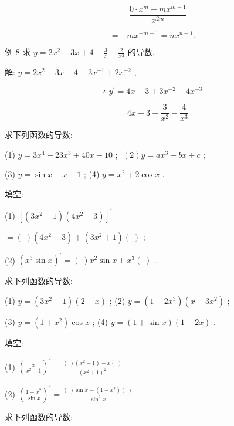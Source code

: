 \documentclass[lang=cn,newtx,10pt,scheme=chinese]{elegantbook}
\begin{document}
\[
= \frac{0 \cdot {x}^{m} - m{x}^{m - 1}}{{x}^{2m}}
\]

\[
= - m{x}^{-m - 1} = n{x}^{n - 1}.
\]

例 8 求 \(y = 2{x}^{2} - {3x} + 4 - \frac{3}{x} + \frac{2}{{x}^{2}}\) 的导数.

解: \(y = 2{x}^{2} - {3x} + 4 - 3{x}^{-1} + 2{x}^{-2}\) ,

\[
\therefore \;{y}^{\prime } = {4x} - 3 + 3{x}^{-2} - 4{x}^{-3}
\]

\[
= {4x} - 3 + \frac{3}{{x}^{2}} - \frac{4}{{x}^{3}}
\]

\begin{problemset}[练习]

\item 求下列函数的导数:

(1) \(y = 3{x}^{4} - {23}{x}^{3} + {40x} - {10}\) ; \(\;\left( 2\right) y = a{x}^{3} - {bx} + c\) ;

(3) \(y = \sin x - x + 1\) ; (4) \(y = {x}^{2} + 2\cos x\) .

\item 填空:

(1) \({\left\lbrack \left( 3{x}^{2} + 1\right) \left( 4{x}^{2} - 3\right) \right\rbrack }^{\prime }\)

\(= \left( \;\right) \left( {4{x}^{2} - 3}\right) + \left( {3{x}^{2} + 1}\right) \left( \;\right)\) ;

(2) \({\left( {x}^{3}\sin x\right) }^{\prime } = \left( \;\right) {x}^{2}\sin x + {x}^{3}\left( \;\right)\) .

\item 求下列函数的导数:

(1) \(y = \left( {3{x}^{2} + 1}\right) \left( {2 - x}\right)\) ; (2) \(y = \left( {1 - 2{x}^{3}}\right) \left( {x - 3{x}^{2}}\right)\) ;

(3) \(y = \left( {1 + {x}^{2}}\right) \cos x\) ; (4) \(y = \left( {1 + \sin x}\right) \left( {1 - {2x}}\right)\) .

\item 填空:

(1) \({\left( \frac{x}{{x}^{2} + 1}\right) }^{\prime } = \frac{\left( \;\right) \left( {{x}^{2} + 1}\right) - x\left( \;\right) }{{\left( {x}^{2} + 1\right) }^{2}}\)

(2) \({\left( \frac{1 - {x}^{2}}{\sin x}\right) }^{\prime } = \frac{\left( \;\right) \sin x - \left( {1 - {x}^{2}}\right) \left( \;\right) }{{\sin }^{2}x}\) .

\item 求下列函数的导数:


\end{problemset}
\end{document}
